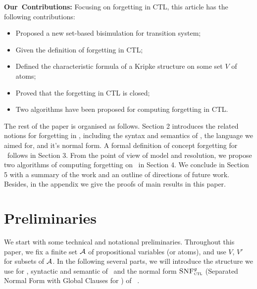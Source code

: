\documentclass{article}
\begin{document}
\textbf{Our\ Contributions:} Focusing on forgetting in CTL, this article has the following contributions:
\begin{itemize}
  \item Proposed a new set-based bisimulation for transition system;
  \item Given the definition of forgetting in CTL;
  \item Defined the characteristic formula of a Kripke structure on some set $V$ of atoms;
  \item Proved that the forgetting in CTL is closed;
  \item Two algorithms have been proposed for computing forgetting in CTL.
\end{itemize}

The rest of the paper is organised as follows. Section 2 introduces the related notions for forgetting in \CTL, including the syntax and semantics of \CTL, the language we aimed for, and it's normal form.
A formal definition of concept forgetting for \CTL\ follows in Section 3.
From the point of view of model and resolution, we propose two algorithms of computing forgetting on \CTL\ in Section 4.
 We conclude in Section 5 with a summary of the work and an outline of directions of future work.
 Besides, in the appendix we give the proofs of main results in this paper.

 \section{Preliminaries}
We start with some technical and notational preliminaries. Throughout this paper, we fix a finite set ${\cal A}$ of propositional variables (or atoms), and use $V$, $V'$ for subsets of ${\cal A}$. In the following several parts, we will introduce the structure we use for \CTL, syntactic and semantic of \CTL\ and the normal form ${\textsc{SNF}_{\textsc{ctl}}^g}$ (Separated Normal Form with Global Clauses for \CTL) of \CTL~\cite{zhang2009refined}.
\end{document}
